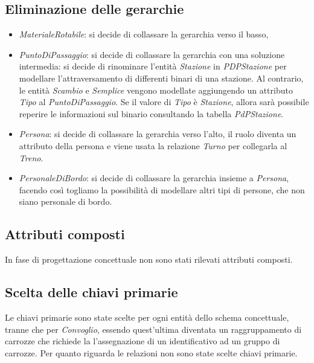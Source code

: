 \documentclass[a4paper,12pt]{report}
\begin{document}
	\subsection{Eliminazione delle gerarchie}
	\begin{itemize}
		\item \textit{MaterialeRotabile}: si decide di collassare la gerarchia verso il basso,
		\item \textit{PuntoDiPassaggio}: si decide di collassare la gerarchia con una soluzione intermedia:
			si decide di rinominare l'entit\`a \textit{Stazione} in \textit{PDPStazione} per modellare l'attraversamento di differenti binari di una stazione.
			Al contrario, le entit\`a \textit{Scambio} e \textit{Semplice} vengono modellate aggiungendo un attributo \textit{Tipo} al \textit{PuntoDiPassaggio}. Se il valore di \textit{Tipo} \`e \textit{Stazione}, allora sar\`a possibile reperire le informazioni sul binario consultando la tabella \textit{PdPStazione}.
		\item \textit{Persona}: si decide di collassare la gerarchia verso l'alto, il ruolo diventa un attributo della persona e viene usata la relazione \textit{Turno} per collegarla al \textit{Treno}.
		\item \textit{PersonaleDiBordo}: si decide di collassare la gerarchia insieme a \textit{Persona}, facendo cos\`i togliamo la possibilit\`a di modellare altri tipi di persone, che non siano personale di bordo.
	\end{itemize}
	\subsection{Attributi composti}
	\par In fase di progettazione concettuale non sono stati rilevati attributi composti.
	\subsection{Scelta delle chiavi primarie}
	\par Le chiavi primarie sono state scelte per ogni entità dello schema concettuale, tranne che per \textit{Convoglio}, essendo quest'ultima diventata un raggruppamento di carrozze che richiede la l'assegnazione di un identificativo ad un gruppo di carrozze. Per quanto riguarda le relazioni non sono state scelte chiavi primarie.
\end{document}
